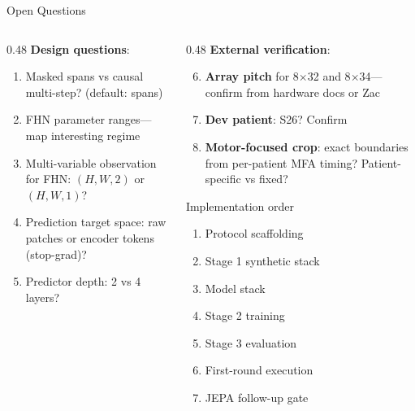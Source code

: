 \documentclass[aspectratio=169, 11pt]{beamer}
\begin{document}
\begin{frame}{Open Questions}

\begin{columns}[T]
\begin{column}{0.48\textwidth}
\textbf{Design questions}:
\begin{enumerate}\small
  \item Masked spans vs causal multi-step? {\scriptsize(default: spans)}
  \item FHN parameter ranges---map interesting regime
  \item Multi-variable observation for FHN: $(H,W,2)$ or $(H,W,1)$?
  \item Prediction target space: raw patches or encoder tokens (stop-grad)?
  \item Predictor depth: 2 vs 4 layers?
\end{enumerate}
\end{column}
\begin{column}{0.48\textwidth}
\textbf{External verification}:
\begin{enumerate}\setcounter{enumi}{5}\small
  \item \textbf{Array pitch} for 8$\times$32 and 8$\times$34---confirm from hardware docs or Zac
  \item \textbf{Dev patient}: S26? Confirm
  \item \textbf{Motor-focused crop}: exact boundaries from per-patient MFA timing? Patient-specific vs fixed?
\end{enumerate}

\vspace{0.4em}
\begin{block}{\small Implementation order}
\scriptsize
\begin{enumerate}
  \item Protocol scaffolding
  \item Stage 1 synthetic stack
  \item Model stack
  \item Stage 2 training
  \item Stage 3 evaluation
  \item First-round execution
  \item JEPA follow-up gate
\end{enumerate}
\end{block}
\end{column}
\end{columns}
\end{frame}

\end{document}

